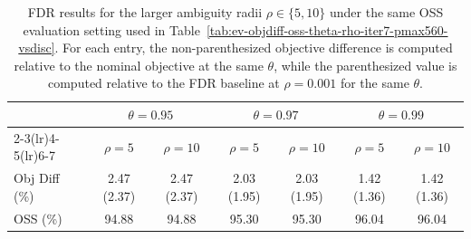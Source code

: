 \documentclass[opre,sglanonrev]{informs4}
\begin{document}
{\begin{table}[!hbtp]
\centering
\caption{FDR results for the larger ambiguity radii $\rho\in\{5,10\}$ under the same OSS evaluation setting used in Table~\ref{tab:ev-objdiff-oss-theta-rho-iter7-pmax560-vsdisc}. For each entry, the non-parenthesized objective difference is computed relative to the nominal objective at the same $\theta$, while the parenthesized value is computed relative to the FDR baseline at $\rho=0.001$ for the same $\theta$.}
\label{tab:fdr-large-rho-supp-compact}
\setlength{\tabcolsep}{5pt}
\renewcommand{\arraystretch}{1}
\scriptsize
\begin{tabular}{l|cc|cc|cc}
\toprule
& \multicolumn{2}{c|}{$\theta=0.95$}
& \multicolumn{2}{c|}{$\theta=0.97$}
& \multicolumn{2}{c}{$\theta=0.99$} \\
\cmidrule(lr){2-3}\cmidrule(lr){4-5}\cmidrule(lr){6-7}
& $\rho=5$ & $\rho=10$ & $\rho=5$ & $\rho=10$ & $\rho=5$ & $\rho=10$ \\
\midrule
Obj Diff (\%) & 2.47 (2.37) & 2.47 (2.37) & 2.03 (1.95) & 2.03 (1.95) & 1.42 (1.36) & 1.42 (1.36) \\
OSS (\%)      & 94.88       & 94.88       & 95.30       & 95.30       & 96.04       & 96.04       \\
\bottomrule
\end{tabular}
\end{table}

}
\end{document}
